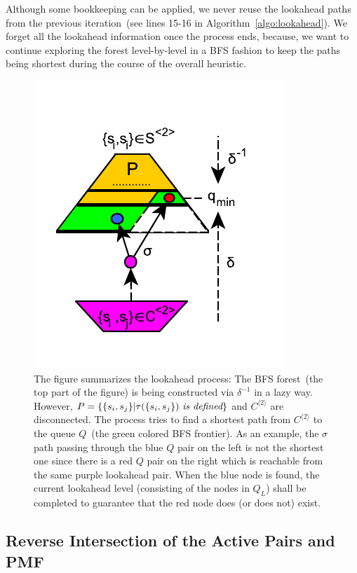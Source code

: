 \documentclass[12pt]{article}
\newcommand{\kkcomm}[1]{{\color{red}{\bf kk: #1}}}
\begin{document}
Although some bookkeeping can be applied, we never reuse the lookahead paths from the previous iteration~(see lines 15-16 in Algorithm~\ref{algo:lookahead}). We forget all the lookahead information once the process ends, because, we want to continue exploring the forest level-by-level in a BFS fashion to keep the paths being shortest during the course of the overall heuristic. \kkcomm{tam anlamadim niye tutmuyoruz, ise yaramaz diye miydi?, bunu aciklayaylim mi} 

\begin{figure}[ht]
	\centering
	\includegraphics{figs/la.pdf}
	\caption{The figure summarizes the lookahead process: The BFS forest~(the top part of the figure) is being constructed via $\delta^{-1}$ in a lazy way. However, $P = \{ \{s_i, s_j \} | \tau(\{s_i, s_j \})~ \mbox{\em is defined} \}$ and $C^{\langle 2 \rangle}$ are disconnected. The process tries to find a shortest path from $C^{\langle 2 \rangle}$ to the queue $Q$~(the green colored BFS frontier). As an example, the $\sigma$ path passing through the blue $Q$ pair on the left is not the shortest one since there is a red $Q$ pair on the right which is reachable from the same purple lookahead pair. When the blue node is found, the current lookahead level (consisting of the nodes in $Q_L$) shall be completed to guarantee that the red node does (or does not) exist.}
	\label{fig:lookahead}
\end{figure}



\subsection{Reverse Intersection of the Active Pairs and PMF}
\label{sec:smart}
\end{document}
